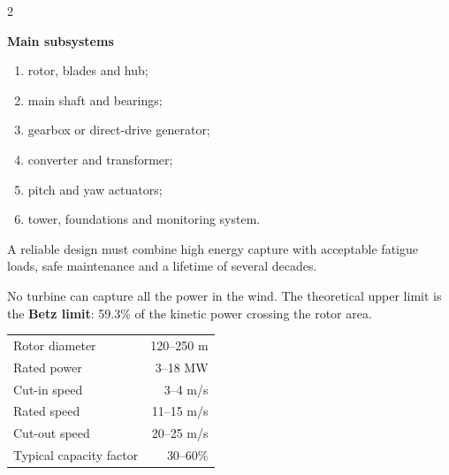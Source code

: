 \begin{multicols}{2}
\begin{engineeringfocus}
\textbf{Main subsystems}
\begin{enumerate}[leftmargin=*,itemsep=1pt]
\item rotor, blades and hub;
\item main shaft and bearings;
\item gearbox or direct-drive generator;
\item converter and transformer;
\item pitch and yaw actuators;
\item tower, foundations and monitoring system.
\end{enumerate}

A reliable design must combine high energy capture with acceptable fatigue loads, safe
maintenance and a lifetime of several decades.
\end{engineeringfocus}

\begin{tcolorbox}[title=\sffamily\bfseries Did You Know?,colback=yellow!10,colframe=ECOrange]
No turbine can capture all the power in the wind. The theoretical upper limit is the
\textbf{Betz limit}: 59.3\% of the kinetic power crossing the rotor area.
\end{tcolorbox}

\begin{tcolorbox}[title=\sffamily\bfseries Key Figures,colback=ECLightBlue,colframe=ECBlue]
\begin{tabularx}{\linewidth}{@{}Xr@{}}
Rotor diameter & 120--250 m\\
Rated power & 3--18 MW\\
Cut-in speed & 3--4 m/s\\
Rated speed & 11--15 m/s\\
Cut-out speed & 20--25 m/s\\
Typical capacity factor & 30--60\%
\end{tabularx}
\end{tcolorbox}

\columnbreak

\begin{tcolorbox}[title=\sffamily\bfseries Wind-turbine architecture,colback=white,colframe=ECBlue]
\centering
{}
\end{tcolorbox}


\end{multicols}
